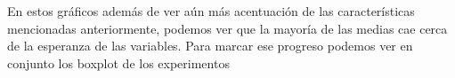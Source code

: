 \documentclass[a4paper]{article}
\begin{document}
\begin{figure}[H]
	\end{figure}
	
	En estos gr\'aficos además de ver a\'un m\'as acentuaci\'on de las caracter\'isticas mencionadas anteriormente, podemos ver que la mayor\'ia de las medias cae cerca de la esperanza de las variables.
	Para marcar ese progreso podemos ver en conjunto los boxplot de los experimentos
	
	\begin{figure}[H]
		\centering
	\end{figure}
	
\end{document}
